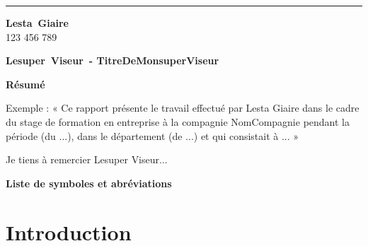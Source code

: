 \documentclass[12pt]{article} 	%
\newcommand\nomCompagnie{NomCompagnie}
\newcommand\prenomStagiaire{Lesta}
\newcommand\nomStagiaire{Giaire}
\newcommand\idul{123 456 789}
\newcommand\prenomSuperviseur{Lesuper}
\newcommand\nomSuperviseur{Viseur}
\newcommand\titreSuperviseur{TitreDeMonsuperViseur}
\begin{document}
\par\noindent\rule{\textwidth}{0.4pt}
\begin{minipage}[t]{6cm}
    \begin{flushleft}
        \textbf {\prenomStagiaire~\nomStagiaire}\\
        \idul
    \end{flushleft}
\end{minipage}
\begin{minipage}[t]{10cm}
    \begin{flushright}
        \hspace*{1cm}\textbf {\prenomSuperviseur~\nomSuperviseur~- \titreSuperviseur} \\
    \end{flushright}
\end{minipage}

\newpage
{}
\textbf{Résumé}  %

Exemple : « Ce rapport présente le travail effectué par {\prenomStagiaire}
    {\nomStagiaire} dans le cadre du stage de formation en entreprise à la
compagnie {\nomCompagnie} pendant la période (du ...), dans le département
(de ...) et qui consistait à ... »


\newpage
\vspace*{\fill}
\begin{center}
    Je tiens à remercier {\prenomSuperviseur} {\nomSuperviseur}...
\end{center}
\vspace*{\fill}


\newpage
\tableofcontents


\newpage
\listoftables


\newpage
\listoffigures


\newpage
\textbf{Liste de symboles et abréviations}\\
\break


\newpage
{}

\section{Introduction}  %
\end{document}
